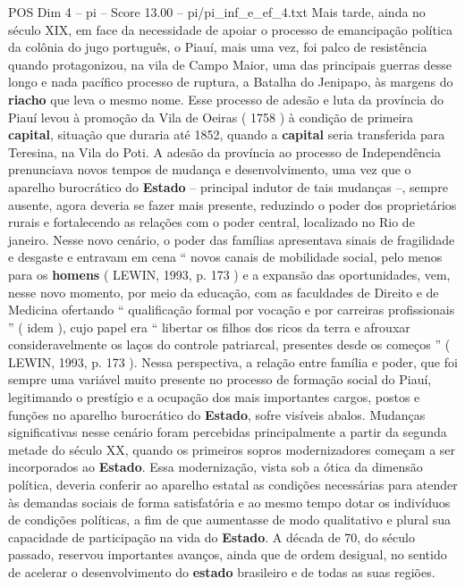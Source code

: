\begin{textsample}{POS Dim 4 – pi – Score 13.00 – pi/pi\_inf\_e\_ef\_4.txt}
Mais tarde, ainda no século XIX, em face da necessidade de apoiar o processo de emancipação política da colônia do jugo português, o Piauí, mais uma vez, foi palco de resistência quando protagonizou, na vila de Campo Maior, uma das principais guerras desse longo e nada pacífico processo de ruptura, a Batalha do Jenipapo, às margens do \textbf{riacho} que leva o mesmo nome.
Esse processo de adesão e luta da província do Piauí levou à promoção da Vila de Oeiras ( 1758 ) à condição de primeira \textbf{capital}, situação que duraria até 1852, quando a \textbf{capital} seria transferida para Teresina, na Vila do Poti.
A adesão da província ao processo de Independência prenunciava novos tempos de mudança e desenvolvimento, uma vez que o aparelho burocrático do \textbf{Estado} – principal indutor de tais mudanças –, sempre ausente, agora deveria se fazer mais presente, reduzindo o poder dos proprietários rurais e fortalecendo as relações com o poder central, localizado no Rio de janeiro.
Nesse novo cenário, o poder das famílias apresentava sinais de fragilidade e desgaste e entravam em cena “ novos canais de mobilidade social, pelo menos para os \textbf{homens} ( LEWIN, 1993, p. 173 ) e a expansão das oportunidades, vem, nesse novo momento, por meio da educação, com as faculdades de Direito e de Medicina ofertando “ qualificação formal por vocação e por carreiras profissionais ” ( idem ), cujo papel era “ libertar os filhos dos ricos da terra e afrouxar consideravelmente os laços do controle patriarcal, presentes desde os começos ” ( LEWIN, 1993, p. 173 ).
Nessa perspectiva, a relação entre família e poder, que foi sempre uma variável muito presente no processo de formação social do Piauí, legitimando o prestígio e a ocupação dos mais importantes cargos, postos e funções no aparelho burocrático do \textbf{Estado}, sofre visíveis abalos.
Mudanças significativas nesse cenário foram percebidas principalmente a partir da segunda metade do século XX, quando os primeiros sopros modernizadores começam a ser incorporados ao \textbf{Estado}.
Essa modernização, vista sob a ótica da dimensão política, deveria conferir ao aparelho estatal as condições necessárias para atender às demandas sociais de forma satisfatória e ao mesmo tempo dotar os indivíduos de condições políticas, a fim de que aumentasse de modo qualitativo e plural sua capacidade de participação na vida do \textbf{Estado}.
A década de 70, do século passado, reservou importantes avanços, ainda que de ordem desigual, no sentido de acelerar o desenvolvimento do \textbf{estado} brasileiro e de todas as suas regiões.

\end{textsample}
